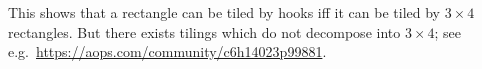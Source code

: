 \begin{remark*}
  This shows that a rectangle can be tiled by hooks
  iff it can be tiled by $3 \times 4$ rectangles.
  But there exists tilings which do not decompose into $3 \times 4$;
  see e.g.\ \url{https://aops.com/community/c6h14023p99881}.
\end{remark*}

